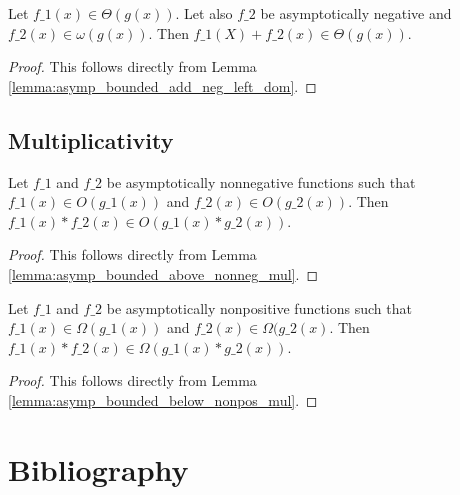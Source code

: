 \begin{theorem}
    \label{thm:theta_add_neg_omega}
    \leanok
    Let $f\_1(x) \in \Theta(g(x))$. Let also $f\_2$ be asymptotically negative and
    $f\_2(x) \in \omega(g(x))$. Then $f\_1(X) + f\_2(x) \in \Theta(g(x))$.
\end{theorem}

\begin{proof}
    \leanok
    This follows directly from Lemma \ref{lemma:asymp_bounded_add_neg_left_dom}.
\end{proof}


\section{Multiplicativity}

\begin{lemma}
    \label{lemma:big_o_nonneg_mul}
    \leanok
    Let $f\_1$ and $f\_2$ be asymptotically nonnegative functions such that 
    $f\_1(x) \in O(g\_1(x))$ and $f\_2(x) \in O(g\_2(x))$. Then 
    $f\_1(x) * f\_2(x) \in O(g\_1(x) * g\_2(x))$.
\end{lemma}

\begin{proof}
    \leanok
    This follows directly from Lemma \ref{lemma:asymp_bounded_above_nonneg_mul}.
\end{proof}

\begin{lemma}
    \label{lemma:big_omega_nonpos_mul}
    \leanok
    Let $f\_1$ and $f\_2$ be asymptotically nonpositive functions such that 
    $f\_1(x) \in \Omega(g\_1(x))$ and $f\_2(x) \in \Omega(g\_2(x)$. 
    Then $f\_1(x) * f\_2(x) \in \Omega(g\_1(x) * g\_2(x))$.
\end{lemma}

\begin{proof}
    \leanok
    This follows directly from Lemma \ref{lemma:asymp_bounded_below_nonpos_mul}.
\end{proof}


\chapter{Bibliography}


